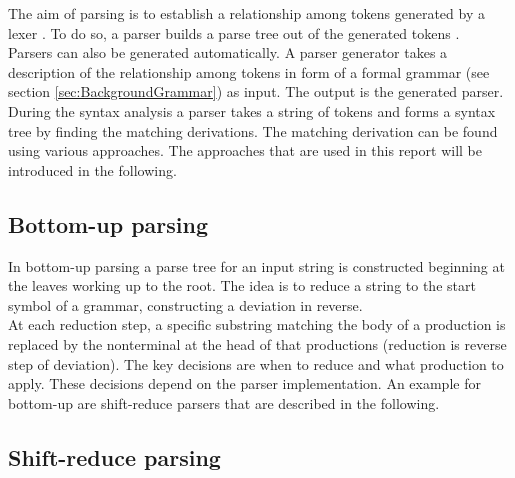 The aim of parsing is to establish a relationship among tokens generated by a lexer \cite{LexYacc.1992}.
To do so, a parser builds a parse tree out of the generated tokens \cite{Mogensen.2017}.\\
Parsers can also be generated automatically.
A parser generator takes a description of the relationship among tokens in form of a formal grammar (see section \ref{sec:BackgroundGrammar}) as input. The output is the generated parser. \cite{LexYacc.1992}\\
During the syntax analysis a parser takes a string of tokens and forms a syntax tree by finding the matching derivations. The matching derivation can be found using various approaches. The approaches that are used in this report will be introduced in the following.

\subsection{Bottom-up parsing}\label{sec:BackgroundParserBottomUp}

In bottom-up parsing a parse tree for an input string is constructed beginning at the leaves working up to the root. The idea is to reduce a string to the start symbol of a grammar, constructing a deviation in reverse.
\cite{Aho.2007}\\
At each reduction step, a specific substring matching the body of a production is replaced by the nonterminal at the head of that productions (reduction is reverse step of deviation).
The key decisions are when to reduce and what production to apply.
These decisions depend on the parser implementation.
An example for bottom-up are shift-reduce parsers that are described in the following.
\cite{Aho.2007}
\subsection{Shift-reduce parsing}\label{sec:BackgroundParserShiftReduce}

